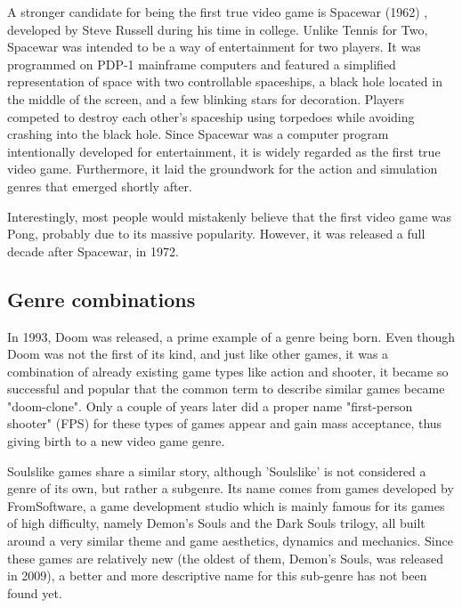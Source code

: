 A stronger candidate for being the first true video game is Spacewar (1962) \cite{spacewar1962}, developed by Steve Russell during his time in college. Unlike Tennis for Two, Spacewar was intended to be a way of entertainment for two players. It was programmed on PDP-1 mainframe computers and featured a simplified representation of space with two controllable spaceships, a black hole located in the middle of the screen, and a few blinking stars for decoration. Players competed to destroy each other's spaceship using torpedoes while avoiding crashing into the black hole. Since Spacewar was a computer program intentionally developed for entertainment, it is widely regarded as the first true video game. Furthermore, it laid the groundwork for the action and simulation genres that emerged shortly after\cite{malliet2005history}.

Interestingly, most people would mistakenly believe that the first video game was Pong\cite{pong1972}, probably due to its massive popularity. However, it was released a full decade after Spacewar, in 1972.



\subsection{Genre combinations}

In 1993, Doom\cite{doom1993} was released, a prime example of a genre being born. Even though Doom was not the first of its kind, and just like other games, it was a combination of already existing game types like action and shooter, it became so successful and popular that the common term to describe similar games became "doom-clone". Only a couple of years later did a proper name "first-person shooter" (FPS) for these types of games appear and gain mass acceptance\cite{arsenault2009}, thus giving birth to a new video game genre.

Soulslike games share a similar story, although 'Soulslike' is not considered a genre of its own, but rather a subgenre. Its name comes from games developed by FromSoftware, a game development studio which is mainly famous for its games of high difficulty, namely Demon's Souls and the Dark Souls trilogy, all built around a very similar theme and game aesthetics, dynamics and mechanics\cite{hunicke2004mda}. Since these games are relatively new (the oldest of them, Demon's Souls, was released in 2009), a better and more descriptive name for this sub-genre has not been found yet.



